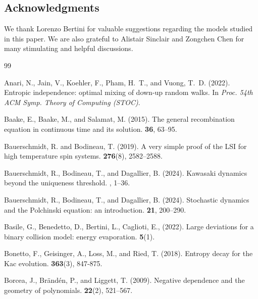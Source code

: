\documentclass[11pt,reqno]{amsart}
\numberwithin{equation}{section}
\numberwithin{figure}{section}
\newcommand{\1}{\mathds{1}}
\begin{document}
\bigskip

\subsection*{Acknowledgments}
We thank Lorenzo Bertini for valuable suggestions regarding the models studied in this paper. We are also grateful to Alistair Sinclair and Zongchen Chen for many stimulating and helpful discussions.
\bigskip


\begin{thebibliography}{99}

Anari, N., Jain, V., Koehler, F., Pham, H.~T., and Vuong, T.~D. (2022).
\newblock Entropic independence: optimal mixing of down-up random walks.
\newblock In {\em Proc. 54th ACM Symp. Theory of Computing (STOC)}.

Baake, E., Baake, M., and Salamat, M. (2015).
\newblock The general recombination equation in continuous time and its solution.
 {\bf 36}, 63--95.

Bauerschmidt, R. and Bodineau, T. (2019).
\newblock A very simple proof of the LSI for high temperature spin systems.
 {\bf 276}(8), 2582--2588.

Bauerschmidt, R., Bodineau, T., and Dagallier, B. (2024).
\newblock Kawasaki dynamics beyond the uniqueness threshold.
, 1--36.

Bauerschmidt, R., Bodineau, T., and Dagallier, B. (2024).
\newblock Stochastic dynamics and the Polchinski equation: an introduction.
 {\bf 21}, 200--290.

Basile, G., Benedetto, D., Bertini, L., Caglioti, E.,  (2022). 
\newblock Large deviations for a binary collision model: energy evaporation. 
 {\bf 5}(1).



Bonetto, F., Geisinger, A., Loss, M., and Ried, T. (2018). 
\newblock Entropy decay for the Kac evolution. 
 {\bf 363}(3), 847-875.

Borcea, J., Br\"and\'en, P., and Liggett, T. (2009).
\newblock Negative dependence and the geometry of polynomials.
 {\bf 22}(2), 521--567.


\end{thebibliography}
\end{document}
